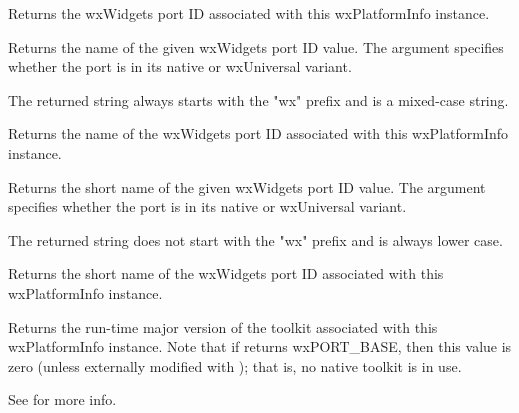 
Returns the wxWidgets port ID associated with this wxPlatformInfo instance.

\label{wxplatforminfogetportidname}


Returns the name of the given wxWidgets port ID value. The 
argument specifies whether the port is in its native or wxUniversal variant.

The returned string always starts with the "wx" prefix and is a mixed-case
string.


Returns the name of the wxWidgets port ID associated with this wxPlatformInfo instance.




\label{wxplatforminfogetportidshortname}


Returns the short name of the given wxWidgets port ID value. The
 argument specifies whether the port is in its native or
wxUniversal variant.

The returned string does not start with the "wx" prefix and is always lower
case.


Returns the short name of the wxWidgets port ID associated with this wxPlatformInfo instance.




\label{wxplatforminfogettoolkitmajorversion}


Returns the run-time major version of the toolkit associated with this wxPlatformInfo instance.
Note that if  returns wxPORT\_BASE, then this value is zero (unless externally modified with ); that is, no native toolkit is in use.

See  for more info.



